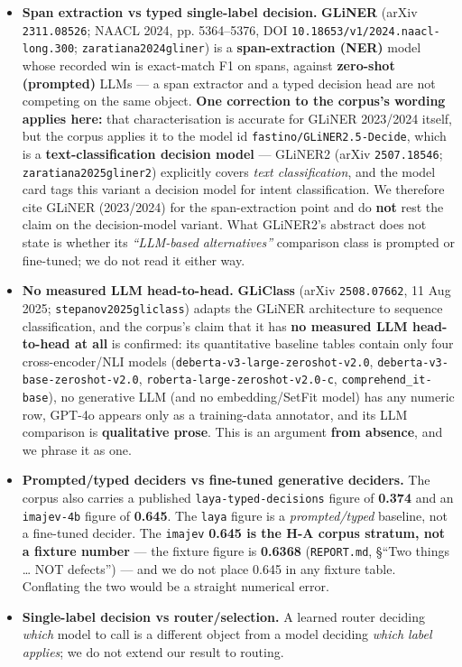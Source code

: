 \documentclass[11pt,a4paper]{article}
\begin{document}
\begin{itemize}
\item \textbf{Span extraction vs typed single-label decision.} \textbf{GLiNER} (arXiv \texttt{2311.08526}; NAACL 2024, pp. 5364--5376, DOI \texttt{10.18653/v1/2024.naacl-long.300}; \texttt{zaratiana2024gliner}\cite{zaratiana2024gliner}) is a \textbf{span-extraction (NER)} model whose recorded win is exact-match F1 on spans, against \textbf{zero-shot (prompted)} LLMs --- a span extractor and a typed decision head are not competing on the same object. \textbf{One correction to the corpus's wording applies here:} that characterisation is accurate for GLiNER 2023/2024 itself, but the corpus applies it to the model id \texttt{fastino/GLiNER2.5-Decide}, which is a \textbf{text-classification decision model} --- GLiNER2 (arXiv \texttt{2507.18546}; \texttt{zaratiana2025gliner2}\cite{zaratiana2025gliner2}) explicitly covers \emph{text classification}, and the model card tags this variant a decision model for intent classification. We therefore cite GLiNER (2023/2024) for the span-extraction point and do \textbf{not} rest the claim on the decision-model variant. What GLiNER2's abstract does not state is whether its \emph{``LLM-based alternatives''} comparison class is prompted or fine-tuned; we do not read it either way.
\item \textbf{No measured LLM head-to-head.} \textbf{GLiClass} (arXiv \texttt{2508.07662}, 11 Aug 2025; \texttt{stepanov2025gliclass}\cite{stepanov2025gliclass}) adapts the GLiNER architecture to sequence classification, and the corpus's claim that it has \textbf{no measured LLM head-to-head at all} is confirmed: its quantitative baseline tables contain only four cross-encoder/NLI models (\texttt{deberta-v3-large-zeroshot-v2.0}, \texttt{deberta-v3-base-zeroshot-v2.0}, \texttt{roberta-large-zeroshot-v2.0-c}, \texttt{comprehend\_it-base}), no generative LLM (and no embedding/SetFit model) has any numeric row, GPT-4o appears only as a training-data annotator, and its LLM comparison is \textbf{qualitative prose}. This is an argument \textbf{from absence}, and we phrase it as one.
\item \textbf{Prompted/typed deciders vs fine-tuned generative deciders.} The corpus also carries a published \texttt{laya-typed-decisions} figure of \textbf{0.374} and an \texttt{imajev-4b} figure of \textbf{0.645}. The \texttt{laya} figure is a \emph{prompted/typed} baseline, not a fine-tuned decider. The \texttt{imajev} \textbf{0.645 is the H-A corpus stratum, not a fixture number} --- the fixture figure is \textbf{0.6368} (\texttt{REPORT.md}, \S``Two things \ldots{} NOT defects'') --- and we do not place 0.645 in any fixture table. Conflating the two would be a straight numerical error.
\item \textbf{Single-label decision vs router/selection.} A learned router deciding \emph{which} model to call is a different object from a model deciding \emph{which label applies}; we do not extend our result to routing.
\end{itemize}
\end{document}
